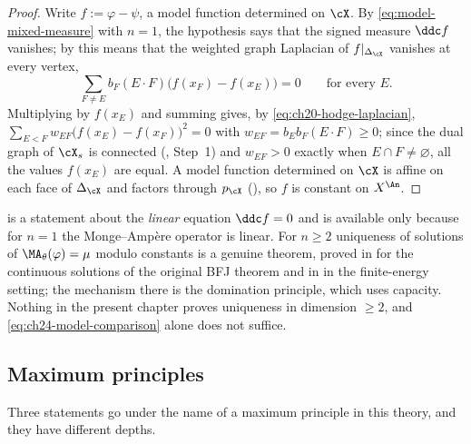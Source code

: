 \begin{proof}
Write \(f:=\varphi-\psi\), a model function determined on \(\cX\).  By
\eqref{eq:model-mixed-measure} with \(n=1\), the hypothesis says that the
signed measure \(\ddc f\) vanishes; by
 this means that the weighted graph
Laplacian of \(f|_{\Delta_{\cX}}\) vanishes at every vertex,
\[
 \sum_{F\neq E}b_F(E\cdot F)\bigl(f(x_F)-f(x_E)\bigr)=0
 \qquad\text{for every }E .
\]
Multiplying by \(f(x_E)\) and summing gives, by
\eqref{eq:ch20-hodge-laplacian},
\(\sum_{E<F}w_{EF}\bigl(f(x_E)-f(x_F)\bigr)^2=0\) with
\(w_{EF}=b_Eb_F(E\cdot F)\geq0\); since the dual graph of \(\cX_s\) is
connected (, Step~1) and \(w_{EF}>0\) exactly when
\(E\cap F\neq\varnothing\), all the values \(f(x_E)\) are equal.  A model
function determined on \(\cX\) is affine on each face of
\(\Delta_{\cX}\) and factors through \(p_{\cX}\)
(), so \(f\) is constant on \(X^{\An}\).
\end{proof}

\begin{remark}
\label{rem:ch24-uniqueness-scope}
 is a statement about the
\emph{linear} equation \(\ddc f=0\) and is available only because for
\(n=1\) the Monge--Amp\`ere operator is linear.  For \(n\geq2\) uniqueness of
solutions of \(\MA_\theta(\varphi)=\mu\) modulo constants is a genuine
theorem, proved in  for the continuous solutions
of the original BFJ theorem and in  in
the finite-energy setting; the mechanism there is the domination principle,
which uses capacity.  Nothing in the present chapter proves uniqueness in
dimension \(\geq2\), and \eqref{eq:ch24-model-comparison} alone does not
suffice.
\end{remark}

\subsection{Maximum principles}
\label{sec:ch24-max}

Three statements go under the name of a maximum principle in this theory,
and they have different depths.

